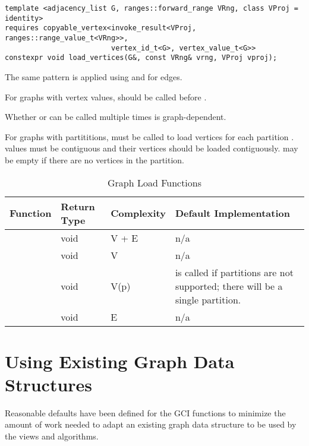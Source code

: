\begin{lstlisting}
template <adjacency_list G, ranges::forward_range VRng, class VProj = identity>
requires copyable_vertex<invoke_result<VProj, ranges::range_value_t<VRng>>,
                         vertex_id_t<G>, vertex_value_t<G>>
constexpr void load_vertices(G&, const VRng& vrng, VProj vproj);
\end{lstlisting}

The same pattern is applied using  and  for edges.

For graphs with vertex values,  should be called before .

Whether  or  can be called multiple times is graph-dependent.

For graphs with partititions,  must be called to load vertices for each 
partition .  values must be contiguous and their vertices should be loaded
contiguously.  may be empty if there are no vertices in the partition. 

\begin{table}[h!]
\begin{center}
\resizebox{\textwidth}{!}
{\begin{tabular}{l l p{1.5cm} L{7.0cm}}
\hline
    \textbf{Function} & \textbf{Return Type} & \textbf{Complexity} & \textbf{Default Implementation} \\
\hline
     & void & V + E & n/a \\
     & void & V & n/a \\
     & void & V(p) &  is called if partitions are not supported; there will be a single partition. \\
     & void & E & n/a \\
\hline
\end{tabular}}
\caption{Graph Load Functions}
\label{tab:load_func}
\end{center}
\end{table}

\section{Using Existing Graph Data Structures}
Reasonable defaults have been defined for the GCI functions to minimize the amount of work
needed to adapt an existing graph data structure to be used by the views and algorithms.

